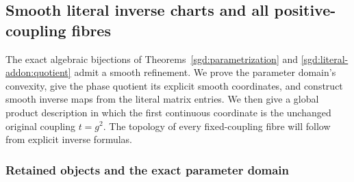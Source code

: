 \subsection{Smooth literal inverse charts and all positive-coupling fibres}
\label{sgd:smooth-addon:section}

The exact algebraic bijections of
Theorems~\ref{sgd:parametrization} and
\ref{sgd:literal-addon:quotient} admit a smooth refinement.
We prove the parameter domain's convexity, give the phase quotient
its explicit smooth coordinates, and construct smooth inverse maps
from the literal matrix entries. We then give a global product
description in which the first continuous coordinate is the unchanged
original coupling $t=g^2$. The topology of every fixed-coupling fibre
will follow from explicit inverse formulas.

\subsubsection{Retained objects and the exact parameter domain}

